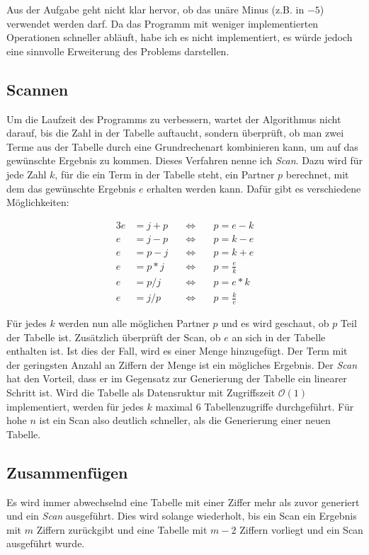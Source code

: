 \documentclass[a4paper,10pt,ngerman]{scrartcl}
\begin{document}
Aus der Aufgabe geht nicht klar hervor, ob das unäre Minus (z.B. in $-5$) verwendet werden darf.
Da das Programm mit weniger implementierten Operationen schneller abläuft, habe ich es nicht implementiert, es würde jedoch eine sinnvolle Erweiterung des Problems darstellen.

\subsection{Scannen}
\label{sec:idea:scan}
Um die Laufzeit des Programms zu verbessern, wartet der Algorithmus nicht darauf, bis die Zahl in der Tabelle auftaucht, sondern überprüft, ob man zwei Terme aus der Tabelle durch eine Grundrechenart kombinieren kann, um auf das gewünschte Ergebnis zu kommen.
Dieses Verfahren nenne ich \textit{Scan}.
Dazu wird für jede Zahl $k$, für die ein Term in der Tabelle steht, ein Partner $p$ berechnet, mit dem das gewünschte Ergebnis $e$ erhalten werden kann.
Dafür gibt es verschiedene Möglichkeiten:

\begin{alignat*}{3}
  e &= j + p \quad &\Leftrightarrow& \quad p = e - k \\
  e &= j - p \quad &\Leftrightarrow& \quad p = k - e \\
  e &= p - j \quad &\Leftrightarrow& \quad p = k + e \\
  e &= p * j \quad &\Leftrightarrow& \quad p = \frac{e}{k} \\
  e &= p / j \quad &\Leftrightarrow& \quad p = e * k \\
  e &= j / p \quad &\Leftrightarrow& \quad p = \frac{k}{e}
\end{alignat*}

Für jedes $k$ werden nun alle möglichen Partner $p$ und es wird geschaut, ob $p$ Teil der Tabelle ist.
Zusätzlich überprüft der Scan, ob $e$ an sich in der Tabelle enthalten ist.
Ist dies der Fall, wird es einer Menge hinzugefügt.
Der Term mit der geringsten Anzahl an Ziffern der Menge ist ein mögliches Ergebnis.
Der \textit{Scan} hat den Vorteil, dass er im Gegensatz zur Generierung der Tabelle ein linearer Schritt ist.
Wird die Tabelle als Datensruktur mit Zugriffszeit $\mathcal{O}(1)$ implementiert, werden für jedes $k$ maximal 6 Tabellenzugriffe durchgeführt. 
Für hohe $n$ ist ein Scan also deutlich schneller, als die Generierung einer neuen Tabelle.

\subsection{Zusammenfügen}
Es wird immer abwechselnd eine Tabelle mit einer Ziffer mehr als zuvor generiert und ein \textit{Scan} ausgeführt.
Dies wird solange wiederholt, bis ein Scan ein Ergebnis mit $m$ Ziffern zurückgibt und eine Tabelle mit $m-2$ Ziffern vorliegt und ein Scan ausgeführt wurde.
\end{document}
